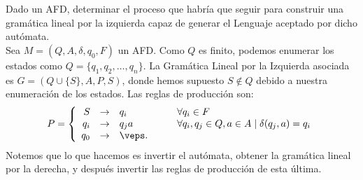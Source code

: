 \begin{ejercicio}
    Dado un AFD, determinar el proceso que habría que seguir para construir una gramática lineal por la izquierda capaz de generar el Lenguaje aceptado por dicho autómata.\\

    Sea $M=(Q, A, \delta, q_0, F)$ un AFD. Como $Q$ es finito, podemos enumerar los estados como $Q=\{q_1, q_2, \ldots, q_n\}$.    
    La Gramática Lineal por la Izquierda asociada es $G=(Q\cup \{S\}, A, P, S)$, donde hemos supuesto $S\notin Q$ debido a nuestra enumeración de los estados. Las reglas de producción son:
    \begin{equation*}
        P=\left\{
            \begin{array}{rcll}
                S &\to& q_i &\qquad \forall q_i\in F\\
                q_i &\to& q_j a &\qquad \forall q_i,q_j\in Q, a\in A \mid \delta(q_j, a)=q_i \\
                q_0 &\to& \veps.
            \end{array}
        \right.
    \end{equation*}
    Notemos que lo que hacemos es invertir el autómata, obtener la gramática lineal por la derecha, y después invertir las reglas de producción de esta última.
\end{ejercicio}

